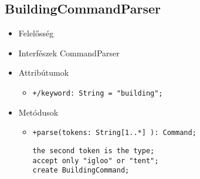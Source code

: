 \subsection{BuildingCommandParser}
\begin{itemize}
\item Felelősség\newline
\item Interfészek\newline
CommandParser
\item Attribútumok
	\begin{itemize}
		\item \texttt{+/keyword: String = "building";}
	\end{itemize}
\item Metódusok
\begin{itemize}
		\item \texttt{+parse(tokens: String[1..*] ): Command;}
		\begin{lstlisting}
the second token is the type;
accept only "igloo" or "tent";
create BuildingCommand;
		\end{lstlisting}
	\end{itemize}
\end{itemize}

